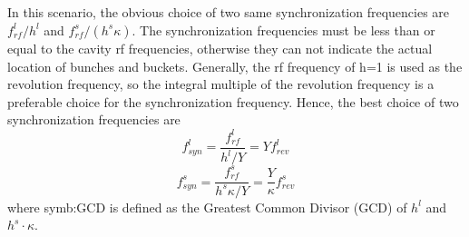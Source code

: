 

In this scenario, the obvious choice of two same synchronization frequencies are $f_{\mathit{rf}}^{l}/h^l $ and $f_{\mathit{rf}}^{s}/(h^{s}\kappa)$. The synchronization frequencies must be less than or equal to the cavity rf frequencies, otherwise they can not indicate the actual location of bunches and buckets. Generally, the rf frequency of h=1 is used as the revolution frequency, so the integral multiple of the revolution frequency is a preferable choice for the synchronization frequency. Hence, the best choice of two synchronization frequencies are 
\begin{equation}
f_{\mathit{syn}}^{l}=\frac{f_{\mathit{rf}}^{l}}{h^{l}/Y}=Yf_{\mathit{rev}}^{l} \label{synch_freq1}
\end{equation}
\begin{equation}
f_{\mathit{syn}}^{s}=\frac{f_{\mathit{rf}}^{s}}{h^{s}\kappa/Y}=\frac{Y}{\kappa}f_{\mathit{rev}}^{s} \label{synch_freq2}
\end{equation}
where \gls{symb:GCD} is defined as the Greatest Common Divisor (\gls{GCD}) of $h^l$ and $h^s \cdot \kappa$. 

